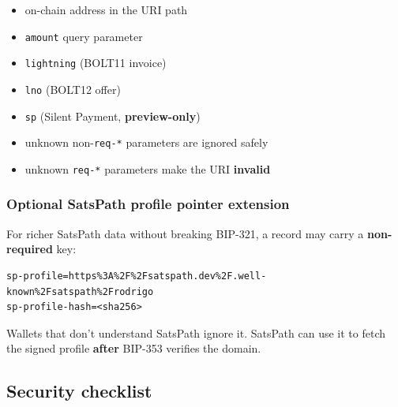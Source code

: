 \documentclass[
]{article}
\providecommand{\tightlist}{%
  \setlength{\itemsep}{0pt}\setlength{\parskip}{0pt}}
\begin{document}
\begin{itemize}
\tightlist
\item
  on-chain address in the URI path
\item
  \texttt{amount} query parameter
\item
  \texttt{lightning} (BOLT11 invoice)
\item
  \texttt{lno} (BOLT12 offer)
\item
  \texttt{sp} (Silent Payment, \textbf{preview-only})
\item
  unknown non-\texttt{req-*} parameters are ignored safely
\item
  unknown \texttt{req-*} parameters make the URI \textbf{invalid}
\end{itemize}

\hypertarget{optional-satspath-profile-pointer-extension}{%
\subsubsection{Optional SatsPath profile pointer
extension}\label{optional-satspath-profile-pointer-extension}}

For richer SatsPath data without breaking BIP-321, a record may carry a
\textbf{non-required} key:

\begin{verbatim}
sp-profile=https%3A%2F%2Fsatspath.dev%2F.well-known%2Fsatspath%2Frodrigo
sp-profile-hash=<sha256>
\end{verbatim}

Wallets that don't understand SatsPath ignore it. SatsPath can use it to
fetch the signed profile \textbf{after} BIP-353 verifies the domain.

\hypertarget{security-checklist}{%
\subsection{Security checklist}\label{security-checklist}}
\end{document}
